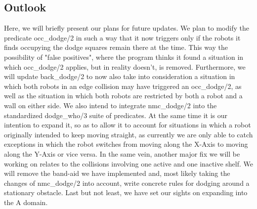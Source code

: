 \documentclass{llncs}
\begin{document}
\subsection{Outlook}
Here, we will briefly present our plans for future updates.\newline
We plan to modify the predicate occ\_dodge/2 in such a way that it now triggers only if the robots it finds occupying the dodge squares remain there at the time. This way the possibility of "false positives", where the program thinks it found a situation in which occ\_dodge/2 applies, but in reality doesn't, is removed. \newline\newline
Furthermore, we will update back\_dodge/2 to now also take into consideration a situation in which both robots in an edge collision may have triggered an occ\_dodge/2, as well as the situation in which both robots are restricted by both a robot and a wall on either side.\newline\newline
We also intend to integrate nmc\_dodge/2 into the standardized dodge\_who/3 suite of predicates. At the same time it is our intention to expand it, so as to allow it to account for situations in which a robot originally intended to keep moving straight, as currently we are only able to catch exceptions in which the robot switches from moving along the X-Axis to moving along the Y-Axis or vice versa.\newline \newline
In the same vein, another major fix we will be working on relates to the collisions involving one active and one inactive shelf. We will remove the band-aid we have implemented and, most likely taking the changes of nmc\_dodge/2 into account, write concrete rules for dodging around a stationary obstacle.\newline\newline
Last but not least, we have set our sights on expanding into the A domain.
\end{document}
